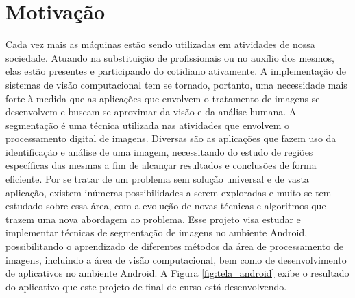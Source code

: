\section{Motivação}
Cada vez mais as máquinas estão sendo utilizadas em atividades de nossa sociedade. Atuando na substituição de profissionais ou no auxílio dos mesmos, elas estão presentes e participando do cotidiano ativamente. A implementação de sistemas de visão computacional tem se tornado, portanto, uma necessidade mais forte à medida que as aplicações que envolvem o tratamento de imagens se desenvolvem e buscam se aproximar da visão e da análise humana.
A segmentação é uma técnica utilizada nas atividades que envolvem o processamento digital de imagens. Diversas são as aplicações que fazem uso da identificação e análise de uma imagem, necessitando do estudo de regiões específicas das mesmas a fim de alcançar resultados e conclusões de forma eficiente.
Por se tratar de um problema sem solução universal e de vasta aplicação, existem inúmeras possibilidades a serem exploradas e muito se tem estudado sobre essa área, com a evolução de novas técnicas e algoritmos que trazem uma nova abordagem ao problema.
Esse projeto visa estudar e implementar técnicas de segmentação de imagens no ambiente Android, possibilitando o aprendizado de diferentes métodos da área de processamento de imagens, incluindo a área de visão computacional, bem como de desenvolvimento de aplicativos no ambiente Android. A Figura \ref{fig:tela_android} exibe o resultado do aplicativo que este projeto de final de curso está desenvolvendo.


